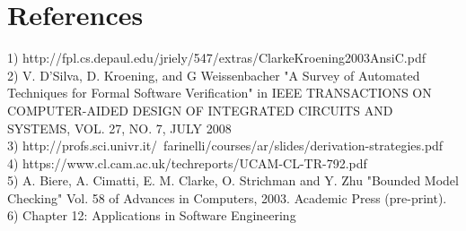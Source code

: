 \section{References}

1)  http://fpl.cs.depaul.edu/jriely/547/extras/ClarkeKroening2003AnsiC.pdf \\

2)  V. D’Silva, D. Kroening, and G Weissenbacher "A Survey of Automated Techniques 
    for Formal Software Verification" in IEEE TRANSACTIONS ON COMPUTER-AIDED DESIGN
    OF INTEGRATED CIRCUITS AND SYSTEMS, VOL. 27, NO. 7, JULY 2008 \\

3)  http://profs.sci.univr.it/~farinelli/courses/ar/slides/derivation-strategies.pdf \\

4)  https://www.cl.cam.ac.uk/techreports/UCAM-CL-TR-792.pdf \\

5)  A. Biere, A. Cimatti, E. M. Clarke, O. Strichman and Y. Zhu 
    "Bounded Model Checking" Vol. 58 of Advances in Computers, 2003.
    Academic Press (pre-print). \\

6)  Chapter 12: Applications in Software Engineering  \\
